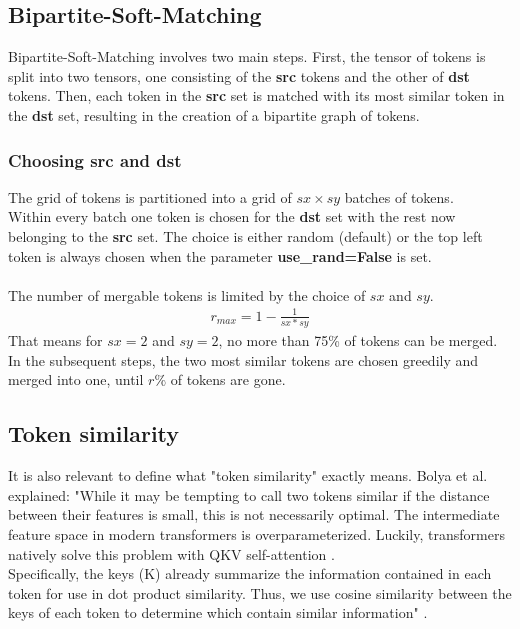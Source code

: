 \subsection{Bipartite-Soft-Matching}
Bipartite-Soft-Matching involves two main steps. First, the tensor of tokens is split into two tensors, one consisting of the \textbf{src} tokens and the other of \textbf{dst} tokens. Then, each token in the \textbf{src} set is matched with its most similar token in the \textbf{dst} set, resulting in the creation of a bipartite graph of tokens. 



\subsubsection*{Choosing src and dst}
The grid of tokens is partitioned into a grid of \(sx \times sy\) batches of tokens.\\
Within every batch one token is chosen for the \textbf{dst} set with the rest now belonging to the \textbf{src} set. The choice is either random (default) or the top left token is always chosen when the parameter \textbf{use\_rand=False} is set.\\
\\
The number of mergable tokens is limited by the choice of \(sx\) and \(sy\).
\begin{align*}
    r_{max} = 1-\frac{1}{sx*sy}
\end{align*}
That means for \(sx = 2\) and \(sy = 2\), no more than 75\% of tokens can be merged.\\
In the subsequent steps, the two most similar tokens are chosen greedily and merged into one, until \(r\%\) of tokens are gone.



\subsection{Token similarity}
It is also relevant to define what "token similarity" exactly means. Bolya et al. explained: "While it may be tempting to call two tokens similar if the distance between their features is small, this is not necessarily optimal. The intermediate feature space in modern transformers is overparameterized. Luckily, transformers natively solve this problem with QKV self-attention \cite{vaswani2017attention}.\\
Specifically, the keys (K) already summarize the information contained in each token for use in dot product similarity. Thus, we use cosine similarity between the keys of each token to determine which contain similar information" \cite{bolya2023tome}.




